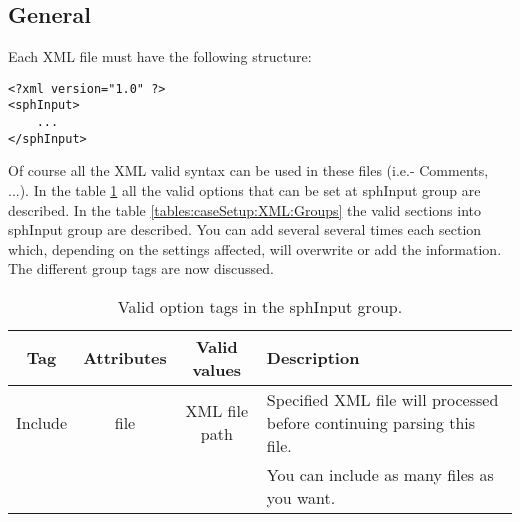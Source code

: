 \subsection{General}
%
Each XML file must have the following structure:
%
\begin{verbatim}
<?xml version="1.0" ?>
<sphInput>
    ...
</sphInput>
\end{verbatim}
%
Of course all the XML valid syntax can be used in these files
(i.e.- Comments, ...). In the table \ref{tables:caseSetup:XML:Options} all the
valid options that can be set at sphInput group are described. In the table
\ref{tables:caseSetup:XML:Groups} the valid sections into sphInput group are
described. You can add several several times each section which, depending on
the settings affected, will overwrite or add the information.
%
The different group tags are now discussed.
%
\begin{table}[h!b!p!]\small
	\centering
	\begin{tabular}{| c | c | c | l | }
		\hline
		\cellcolor[rgb]{0.7,0.7,0.7}Tag & \cellcolor[rgb]{0.7,0.7,0.7}Attributes & \cellcolor[rgb]{0.7,0.7,0.7}Valid values & \cellcolor[rgb]{0.7,0.7,0.7}Description \\
		\hline
		Include & file & XML file path & Specified XML file will processed before continuing parsing this file. \\
		        &      &               & You can include as many files as you want. \\
		\hline
	\end{tabular}
	\caption{Valid option tags in the sphInput group.}
	\label{tables:caseSetup:XML:Options}
\end{table}
%
